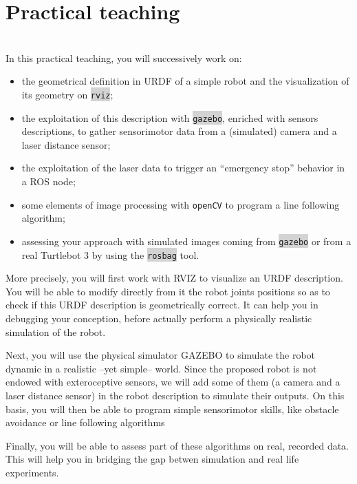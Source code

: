 \documentclass[10pt,a4paper]{upmc}
\newcommand{\myline}{\noindent\makebox[\linewidth]{\rule{\textwidth}{0.7pt}}}
\newcommand{\mytext}[1]{\colorbox{lightgray}{\texttt{#1}}}
\begin{document}
\section{Practical teaching}
\vspace{-0.5cm}\myline\\
In this practical teaching, you will successively work on:
%
\begin{itemize}
  \item	the geometrical definition in URDF of a simple robot and the visualization of its geometry
        on \mytext{rviz};
  \item	the exploitation of this description with \mytext{gazebo}, enriched with sensors
        descriptions, to gather sensorimotor data from a (simulated) camera and a laser distance
        sensor;
  \item	the exploitation of the laser data to trigger an ``emergency stop'' behavior in a ROS node;
  \item	some elements of image processing with \texttt{openCV} to program a line following
        algorithm;
  \item	assessing your approach with simulated images coming from \mytext{gazebo} or from a real
        Turtlebot 3 by using the \mytext{rosbag} tool.
\end{itemize}

More precisely, you will first work with RVIZ to visualize an URDF description. You will be able to
modify directly from it the robot joints positions so as to check if this URDF description is
geometrically correct. It can help you in debugging your conception, before actually perform a
physically realistic simulation of the robot.

Next, you will use the physical simulator GAZEBO to simulate the robot dynamic in a realistic --yet
simple-- world. Since the proposed robot is not endowed with exteroceptive sensors, we will add some
of them (a camera and a laser distance sensor) in the robot description to simulate their outputs.
On this basis, you will then be able to program simple sensorimotor skills, like obstacle avoidance
or line following algorithms

Finally, you will be able to assess part of these algorithms on real, recorded data. This will help
you in bridging the gap betwen simulation and real life experiments.
\end{document}
